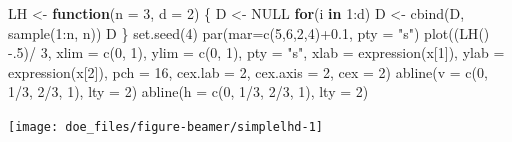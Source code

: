 \documentclass[
  ignorenonframetext,
]{beamer}
\newenvironment{Shaded}{\begin{snugshade}}{\end{snugshade}}
\newcommand{\AttributeTok}[1]{\textcolor[rgb]{0.77,0.63,0.00}{#1}}
\newcommand{\ConstantTok}[1]{\textcolor[rgb]{0.00,0.00,0.00}{#1}}
\newcommand{\ControlFlowTok}[1]{\textcolor[rgb]{0.13,0.29,0.53}{\textbf{#1}}}
\newcommand{\DecValTok}[1]{\textcolor[rgb]{0.00,0.00,0.81}{#1}}
\newcommand{\FloatTok}[1]{\textcolor[rgb]{0.00,0.00,0.81}{#1}}
\newcommand{\FunctionTok}[1]{\textcolor[rgb]{0.00,0.00,0.00}{#1}}
\newcommand{\NormalTok}[1]{#1}
\newcommand{\OtherTok}[1]{\textcolor[rgb]{0.56,0.35,0.01}{#1}}
\newcommand{\SpecialCharTok}[1]{\textcolor[rgb]{0.00,0.00,0.00}{#1}}
\newcommand{\StringTok}[1]{\textcolor[rgb]{0.31,0.60,0.02}{#1}}
\begin{document}
\begin{frame}[fragile]{}
\protect\hypertarget{section-38}{}
\begin{Shaded}
\begin{Highlighting}[]
\NormalTok{LH }\OtherTok{\textless{}{-}} \ControlFlowTok{function}\NormalTok{(}\AttributeTok{n =} \DecValTok{3}\NormalTok{, }\AttributeTok{d =} \DecValTok{2}\NormalTok{) \{}
\NormalTok{    D }\OtherTok{\textless{}{-}} \ConstantTok{NULL}
    \ControlFlowTok{for}\NormalTok{(i }\ControlFlowTok{in} \DecValTok{1}\SpecialCharTok{:}\NormalTok{d) D }\OtherTok{\textless{}{-}} \FunctionTok{cbind}\NormalTok{(D, }\FunctionTok{sample}\NormalTok{(}\DecValTok{1}\SpecialCharTok{:}\NormalTok{n, n))}
\NormalTok{    D }
\NormalTok{\}}
\FunctionTok{set.seed}\NormalTok{(}\DecValTok{4}\NormalTok{)}
\FunctionTok{par}\NormalTok{(}\AttributeTok{mar=}\FunctionTok{c}\NormalTok{(}\DecValTok{5}\NormalTok{,}\DecValTok{6}\NormalTok{,}\DecValTok{2}\NormalTok{,}\DecValTok{4}\NormalTok{)}\SpecialCharTok{+}\FloatTok{0.1}\NormalTok{, }\AttributeTok{pty =} \StringTok{"s"}\NormalTok{)}
\FunctionTok{plot}\NormalTok{((}\FunctionTok{LH}\NormalTok{() }\SpecialCharTok{{-}}\NormalTok{.}\DecValTok{5}\NormalTok{)}\SpecialCharTok{/} \DecValTok{3}\NormalTok{, }\AttributeTok{xlim =} \FunctionTok{c}\NormalTok{(}\DecValTok{0}\NormalTok{, }\DecValTok{1}\NormalTok{), }\AttributeTok{ylim =} \FunctionTok{c}\NormalTok{(}\DecValTok{0}\NormalTok{, }\DecValTok{1}\NormalTok{), }\AttributeTok{pty =} \StringTok{"s"}\NormalTok{, }\AttributeTok{xlab =} \FunctionTok{expression}\NormalTok{(x[}\DecValTok{1}\NormalTok{]), }
     \AttributeTok{ylab =} \FunctionTok{expression}\NormalTok{(x[}\DecValTok{2}\NormalTok{]), }\AttributeTok{pch =} \DecValTok{16}\NormalTok{, }\AttributeTok{cex.lab =} \DecValTok{2}\NormalTok{, }\AttributeTok{cex.axis =} \DecValTok{2}\NormalTok{, }\AttributeTok{cex =} \DecValTok{2}\NormalTok{)}
\FunctionTok{abline}\NormalTok{(}\AttributeTok{v =} \FunctionTok{c}\NormalTok{(}\DecValTok{0}\NormalTok{, }\DecValTok{1}\SpecialCharTok{/}\DecValTok{3}\NormalTok{, }\DecValTok{2}\SpecialCharTok{/}\DecValTok{3}\NormalTok{, }\DecValTok{1}\NormalTok{), }\AttributeTok{lty =} \DecValTok{2}\NormalTok{)}
\FunctionTok{abline}\NormalTok{(}\AttributeTok{h =} \FunctionTok{c}\NormalTok{(}\DecValTok{0}\NormalTok{, }\DecValTok{1}\SpecialCharTok{/}\DecValTok{3}\NormalTok{, }\DecValTok{2}\SpecialCharTok{/}\DecValTok{3}\NormalTok{, }\DecValTok{1}\NormalTok{), }\AttributeTok{lty =} \DecValTok{2}\NormalTok{)}
\end{Highlighting}
\end{Shaded}

\begin{center}\texttt{[image: doe\_files/figure-beamer/simplelhd-1]} \end{center}
\end{frame}
\end{document}
